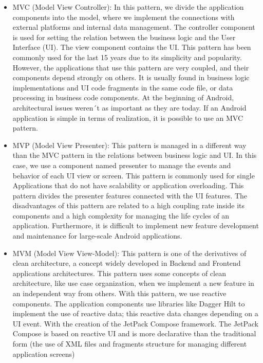 \begin{itemize}
	\item MVC (Model View Controller): In this pattern, we divide the application components into the model, where we implement the connections with external platforms and internal data management. The controller component is used for setting the relation between the business logic and the User Interface (UI). The view component contains the UI. This pattern has been commonly used for the last 15 years due to its simplicity and popularity. However, the applications that use this pattern are very coupled, and their components depend strongly on others. It is usually found in business logic implementations and UI code fragments in the same code file, or data processing in business code components.  At the beginning of Android, architectural issues weren´t as important as they are today. If an Android application is simple in terms of realization, it is possible to use an MVC pattern.
	
	\item MVP (Model View Presenter): This pattern is managed in a different way than the MVC pattern in the relations between business logic and UI. In this case, we use a component named presenter to manage the events and behavior of each UI view or screen. This pattern is commonly used for single Applications that do not have scalability or application overloading. This pattern divides the presenter features connected with the UI features. The disadvantages of this pattern are related to a high coupling rate inside its components and a high complexity for managing the life cycles of an application. Furthermore, it is difficult to implement new feature development and maintenance for large-scale Android applications.
	
	\item MVM (Model View View-Model): This pattern is one of the derivatives of clean architecture, a concept widely developed in Backend and Frontend applications architectures. This pattern uses some concepts of clean architecture, like use case organization, when we implement a new feature in an independent way from others. With this pattern, we use reactive components. The application components use libraries like Dagger Hilt to implement the use of reactive data; this reactive data changes depending on a UI event. With the creation of the JetPack Compose framework. The JetPack Compose is based on reactive UI and is more declarative than the traditional form (the use of XML files and fragments structure for managing different application screens)
\end{itemize}

